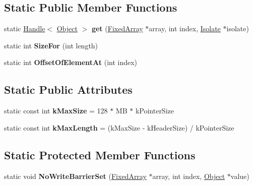 \subsection*{Static Public Member Functions}
\begin{DoxyCompactItemize}
\item 
static \hyperlink{classv8_1_1internal_1_1_handle}{Handle}$<$ \hyperlink{classv8_1_1internal_1_1_object}{Object} $>$ {\bfseries get} (\hyperlink{classv8_1_1internal_1_1_fixed_array}{Fixed\+Array} $\ast$array, int index, \hyperlink{classv8_1_1internal_1_1_isolate}{Isolate} $\ast$isolate)\hypertarget{classv8_1_1internal_1_1_fixed_array_a7f444a997385fc55d1fce4af164af7ee}{}\label{classv8_1_1internal_1_1_fixed_array_a7f444a997385fc55d1fce4af164af7ee}

\item 
static int {\bfseries Size\+For} (int length)\hypertarget{classv8_1_1internal_1_1_fixed_array_aac41d653d6c61ad3a0fd907c2a52fd92}{}\label{classv8_1_1internal_1_1_fixed_array_aac41d653d6c61ad3a0fd907c2a52fd92}

\item 
static int {\bfseries Offset\+Of\+Element\+At} (int index)\hypertarget{classv8_1_1internal_1_1_fixed_array_a40b2c3d748284f90693919d8119a14fb}{}\label{classv8_1_1internal_1_1_fixed_array_a40b2c3d748284f90693919d8119a14fb}

\end{DoxyCompactItemize}
\subsection*{Static Public Attributes}
\begin{DoxyCompactItemize}
\item 
static const int {\bfseries k\+Max\+Size} = 128 $\ast$ MB $\ast$ k\+Pointer\+Size\hypertarget{classv8_1_1internal_1_1_fixed_array_a8c4e197164657e0b412e83afcab550ae}{}\label{classv8_1_1internal_1_1_fixed_array_a8c4e197164657e0b412e83afcab550ae}

\item 
static const int {\bfseries k\+Max\+Length} = (k\+Max\+Size -\/ k\+Header\+Size) / k\+Pointer\+Size\hypertarget{classv8_1_1internal_1_1_fixed_array_affb031e7f10c06f0dd174029fc56efe2}{}\label{classv8_1_1internal_1_1_fixed_array_affb031e7f10c06f0dd174029fc56efe2}

\end{DoxyCompactItemize}
\subsection*{Static Protected Member Functions}
\begin{DoxyCompactItemize}
\item 
static void {\bfseries No\+Write\+Barrier\+Set} (\hyperlink{classv8_1_1internal_1_1_fixed_array}{Fixed\+Array} $\ast$array, int index, \hyperlink{classv8_1_1internal_1_1_object}{Object} $\ast$value)\hypertarget{classv8_1_1internal_1_1_fixed_array_a522aa22b6c539f4427e80b2178a96197}{}\label{classv8_1_1internal_1_1_fixed_array_a522aa22b6c539f4427e80b2178a96197}

\end{DoxyCompactItemize}
